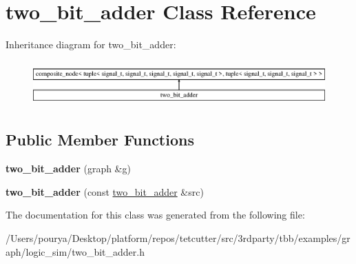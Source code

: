 \hypertarget{classtwo__bit__adder}{}\section{two\+\_\+bit\+\_\+adder Class Reference}
\label{classtwo__bit__adder}
Inheritance diagram for two\+\_\+bit\+\_\+adder\+:\begin{figure}[H]
\begin{center}
\leavevmode
\includegraphics[height=1.739130cm]{classtwo__bit__adder}
\end{center}
\end{figure}
\subsection*{Public Member Functions}
\begin{DoxyCompactItemize}
\item 
\hypertarget{classtwo__bit__adder_a9ec7abb769e2cd90d77dabd8af7f460b}{}{\bfseries two\+\_\+bit\+\_\+adder} (graph \&g)\label{classtwo__bit__adder_a9ec7abb769e2cd90d77dabd8af7f460b}

\item 
\hypertarget{classtwo__bit__adder_ad38e1b9cf88881f3b77f09431e73ac51}{}{\bfseries two\+\_\+bit\+\_\+adder} (const \hyperlink{classtwo__bit__adder}{two\+\_\+bit\+\_\+adder} \&src)\label{classtwo__bit__adder_ad38e1b9cf88881f3b77f09431e73ac51}

\end{DoxyCompactItemize}


The documentation for this class was generated from the following file\+:\begin{DoxyCompactItemize}
\item 
/\+Users/pourya/\+Desktop/platform/repos/tetcutter/src/3rdparty/tbb/examples/graph/logic\+\_\+sim/two\+\_\+bit\+\_\+adder.\+h\end{DoxyCompactItemize}
